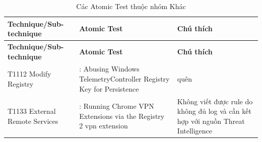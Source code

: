 \begingroup
\small
\renewcommand{\arraystretch}{1.12}
\setlength{\LTpre}{0pt}
\setlength{\LTpost}{0pt}
\begin{longtable}{|>{\raggedright\arraybackslash}p{3.2cm}|>{\raggedright\arraybackslash}p{5.5cm}|>{\raggedright\arraybackslash}p{5.8cm}|}
\caption{Các Atomic Test thuộc nhóm Khác}\label{tab:khac}\\
\hline
\textbf{Technique/Sub-technique} & \textbf{Atomic Test} & \textbf{Chú thích} \\
\hline
\endfirsthead
\hline
\textbf{Technique/Sub-technique} & \textbf{Atomic Test} & \textbf{Chú thích} \\
\hline
\endhead
\hline
\endfoot
\hline
\endlastfoot
T1112 Modify Registry & 85: Abusing Windows TelemetryController Registry Key for Persistence & quên \\
\hline
T1133 External Remote Services & 1: Running Chrome VPN Extensions via the Registry 2 vpn extension & Không viết được rule do không đủ log và cần kết hợp với nguồn Threat Intelligence \\
\hline
\end{longtable}
\endgroup
